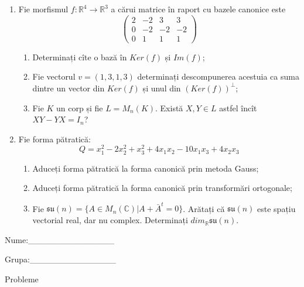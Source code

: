 \documentclass{article}
\begin{document}
\begin{enumerate}
 \item Fie morfismul $f:\mathbb{R}^4 \to \mathbb{R}^3$ a cărui matrice în raport cu bazele canonice este
$$\begin{pmatrix}
2&-2&3&3\\
0&-2&-2&-2\\
0&1&1&1
\end{pmatrix}$$

\begin{enumerate}
\item Determinați cîte o bază în $Ker(f)$ și $Im(f)$;
\item Fie vectorul $v=(1,3,1,3)$ determinați descompunerea acestuia ca suma dintre un vector din $Ker(f)$ și unul din $(Ker(f))^\perp$;
\item Fie $K$ un corp și fie $L=M_n(K)$. Există $X,Y \in L$ astfel încît $XY-YX=I_n$?  
\end{enumerate}
\item Fie forma pătratică:
$$Q= x_1^2-2x_2^2+x_3^2+4x_1x_2-10x_1x_3+4x_2x_3$$

\begin{enumerate}
\item Aduceți forma pătratică la forma canonică prin metoda Gauss;
\item Aduceți forma pătratică la forma canonică prin transformări ortogonale;
\item Fie $\mathfrak{su}(n)=\{ A \in M_n(\mathbb{C}) | A+\bar{A}^t=0\}$. Arătați că $\mathfrak{su}(n)$ este spațiu vectorial real, dar nu complex.
Determinați $dim_{\mathbb{R}}\mathfrak{su}(n)$.
\end{enumerate}
\end{enumerate}
\newpage
\begin{flushright}
Nume:\_\_\_\_\_\_\_\_\_\_\_\_\_\_
 
 
Grupa:\_\_\_\_\_\_\_\_\_\_\_\_\_\_
\end{flushright}
\begin{center}
\vspace{2cm}
{\Large Probleme}
\vspace{2cm}
\end{center}
\end{document}
